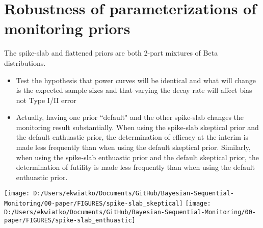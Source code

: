 \documentclass[12pt]{article}
\begin{document}
\section{Robustness of parameterizations of monitoring priors}
The spike-slab and flattened priors are both 2-part mixtures of Beta distributions.
\begin{itemize}
\item Test the hypothesis that power curves will be identical and what will change is the expected sample sizes and that varying the decay rate will affect bias not Type I/II error
\item Actually, having one prior ``default" and the other spike-slab changes the monitoring result substantially. When using the spike-slab skeptical prior and the default enthuastic prior, the determination of efficacy at the interim is made less frequently than when using the default skeptical prior. Similarly, when using the spike-slab enthuastic prior and the default skeptical prior, the determination of futility is made less frequently than when using the default enthuastic prior.
\end{itemize}
\texttt{[image: D:/Users/ekwiatko/Documents/GitHub/Bayesian-Sequential-Monitoring/00-paper/FIGURES/spike-slab\_skeptical]}
\texttt{[image: D:/Users/ekwiatko/Documents/GitHub/Bayesian-Sequential-Monitoring/00-paper/FIGURES/spike-slab\_enthuastic]}
\tiny
\end{document}
